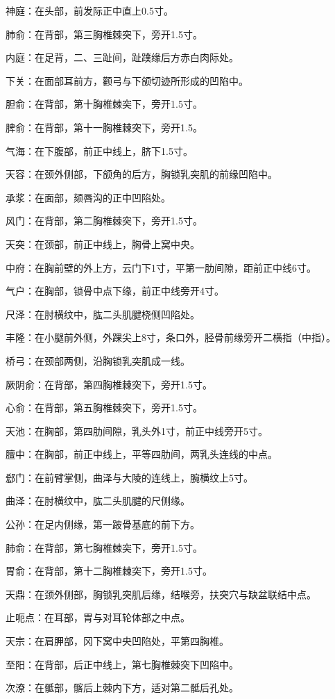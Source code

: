 \documentclass[12pt,UTF8]{ctexbook}
\begin{document}
神庭：在头部，前发际正中直上0.5寸。

肺俞：在背部，第三胸椎棘突下，旁开1.5寸。

内庭：在足背，二、三趾间，趾蹼缘后方赤白肉际处。

下关：在面部耳前方，颧弓与下颌切迹所形成的凹陷中。

胆俞：在背部，第十胸椎棘突下，旁开1.5寸。

脾俞：在背部，第十一胸椎棘突下，旁开1.5。

气海：在下腹部，前正中线上，脐下1.5寸。

天容：在颈外侧部，下颌角的后方，胸锁乳突肌的前缘凹陷中。

承浆：在面部，颏唇沟的正中凹陷处。

风门：在背部，第二胸椎棘突下，旁开1.5寸。

天突：在颈部，前正中线上，胸骨上窝中央。

中府：在胸前壁的外上方，云门下1寸，平第一肋间隙，距前正中线6寸。

气户：在胸部，锁骨中点下缘，前正中线旁开4寸。

尺泽：在肘横纹中，肱二头肌腱桡侧凹陷处。

丰隆：在小腿前外侧，外踝尖上8寸，条口外，胫骨前缘旁开二横指（中指）。

桥弓：在颈部两侧，沿胸锁乳突肌成一线。

厥阴俞：在背部，第四胸椎棘突下，旁开1.5寸。

心俞：在背部，第五胸椎棘突下，旁开1.5寸。

天池：在胸部，第四肋间隙，乳头外1寸，前正中线旁开5寸。

膻中：在胸部，前正中线上，平等四肋间，两乳头连线的中点。

郄门：在前臂掌侧，曲泽与大陵的连线上，腕横纹上5寸。

曲泽：在肘横纹中，肱二头肌腱的尺侧缘。

公孙：在足内侧缘，第一跛骨基底的前下方。

肺俞：在背部，第七胸椎棘突下，旁开1.5寸。

胃俞：在背部，第十二胸椎棘突下，旁开1.5寸。

天鼎：在颈外侧部，胸锁乳突肌后缘，结喉旁，扶突穴与缺盆联结中点。

止呃点：在耳部，胃与对耳轮体部之中点。

天宗：在肩胛部，冈下窝中央凹陷处，平第四胸椎。

至阳：在背部，后正中线上，第七胸椎棘突下凹陷中。

次潦：在骶部，髂后上棘内下方，适对第二骶后孔处。
\end{document}
